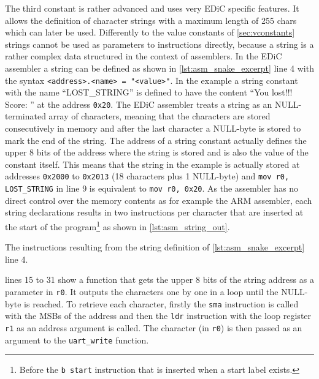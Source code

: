 The third constant is rather advanced and uses very \gls{EDiC} specific features.
It allows the definition of character strings with a maximum length of 255 chars which can later be used.
Differently to the value constants of \cref{sec:vconstants} strings cannot be used as parameters to instructions directly, because a string is a rather complex data structured in the context of assemblers.
In the \gls{EDiC} assembler a string can be defined as shown in \cref{lst:asm_snake_excerpt} line 4 with the syntax \texttt{<address>.<name> = "<value>"}.
In the example a string constant with the name ``LOST\_STRING'' is defined to have the content ``You lost!!! Score: '' at the address \texttt{0x20}.
The \gls{EDiC} assembler treats a string as an NULL-terminated array of characters, meaning that the characters are stored consecutively in memory and after the last character a NULL-byte is stored to mark the end of the string.
The address of a string constant actually defines the upper 8 bits of the address where the string is stored and is also the value of the constant itself.
This means that the string in the example is actually stored at addresses \texttt{0x2000} to \texttt{0x2013} (18 characters plus 1 NULL-byte) and \texttt{mov r0, LOST_STRING} in line 9 is equivalent to \texttt{mov r0, 0x20}.
As the assembler has no direct control over the memory contents as for example the ARM assembler, each string declarations results in two instructions per character that are inserted at the start of the program\footnote{Before the \texttt{b start} instruction that is inserted when a start label exists.} as shown in \cref{lst:asm_string_out}.

\begin{listing}[t]
  \caption{The instructions resulting from the string definition of \cref{lst:asm_snake_excerpt} line 4.}
  \label{lst:asm_string_out}
\end{listing}
 lines 15 to 31 show a function that gets the upper 8 bits of the string address as a parameter in \texttt{r0}.
It outputs the characters one by one in a loop until the NULL-byte is reached.
To retrieve each character, firstly the \texttt{sma} instruction is called with the \glspl{MSB} of the address and then the \texttt{ldr} instruction with the loop register \texttt{r1} as an address argument is called.
The character (in \texttt{r0}) is then passed as an argument to the \texttt{uart\_write} function.

